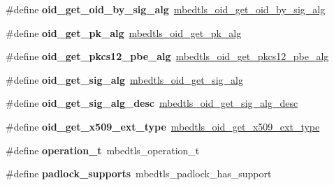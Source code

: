 \begin{DoxyCompactItemize}
\item 
\mbox{\label{compat-1_83_8h_abb5fcf901ef447cf2b5993d689262342}} 
\#define {\bfseries oid\+\_\+get\+\_\+oid\+\_\+by\+\_\+sig\+\_\+alg}~\mbox{\hyperlink{oid_8h_a95b95cb99e0e954313aed008b38fbb2e}{mbedtls\+\_\+oid\+\_\+get\+\_\+oid\+\_\+by\+\_\+sig\+\_\+alg}}
\item 
\mbox{\label{compat-1_83_8h_aa73dbfb9d2baa7b442d482a0a1308126}} 
\#define {\bfseries oid\+\_\+get\+\_\+pk\+\_\+alg}~\mbox{\hyperlink{oid_8h_a3bb2578d76ddc458e60c936ef511f9e1}{mbedtls\+\_\+oid\+\_\+get\+\_\+pk\+\_\+alg}}
\item 
\mbox{\label{compat-1_83_8h_a536c8b625fae83bf8121f86b590020e1}} 
\#define {\bfseries oid\+\_\+get\+\_\+pkcs12\+\_\+pbe\+\_\+alg}~\mbox{\hyperlink{oid_8h_af7871a692283b368b83f85b37e45f92f}{mbedtls\+\_\+oid\+\_\+get\+\_\+pkcs12\+\_\+pbe\+\_\+alg}}
\item 
\mbox{\label{compat-1_83_8h_ace79f15714637eb7767d8655f8aad9d7}} 
\#define {\bfseries oid\+\_\+get\+\_\+sig\+\_\+alg}~\mbox{\hyperlink{oid_8h_abc3e1ab713f5693308de415bbde0d5a0}{mbedtls\+\_\+oid\+\_\+get\+\_\+sig\+\_\+alg}}
\item 
\mbox{\label{compat-1_83_8h_af0daecc81e1e458ec9653aa9ef2b5be5}} 
\#define {\bfseries oid\+\_\+get\+\_\+sig\+\_\+alg\+\_\+desc}~\mbox{\hyperlink{oid_8h_ae57f97127e29c749decfb384b3928952}{mbedtls\+\_\+oid\+\_\+get\+\_\+sig\+\_\+alg\+\_\+desc}}
\item 
\mbox{\label{compat-1_83_8h_a573b9b3fb9e8b24dadb8a8556d0658d6}} 
\#define {\bfseries oid\+\_\+get\+\_\+x509\+\_\+ext\+\_\+type}~\mbox{\hyperlink{oid_8h_a962c76f60bc09ae7174027f8d4111753}{mbedtls\+\_\+oid\+\_\+get\+\_\+x509\+\_\+ext\+\_\+type}}
\item 
\mbox{\label{compat-1_83_8h_a9b1065e39bbaa4d06853b8f297fcb41d}} 
\#define {\bfseries operation\+\_\+t}~mbedtls\+\_\+operation\+\_\+t
\item 
\mbox{\label{compat-1_83_8h_ad0f96d6220bcf9718d8c07489d0f2495}} 
\#define {\bfseries padlock\+\_\+supports}~mbedtls\+\_\+padlock\+\_\+has\+\_\+support
\item 

\end{DoxyCompactItemize}
